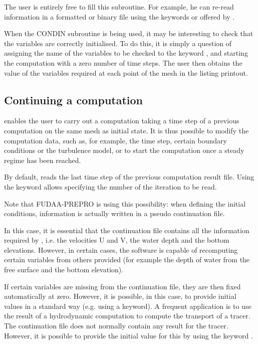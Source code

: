  The user is entirely free to fill this subroutine. For example, he can re-read information in a formatted or binary file using the keywords  or  offered by .

 When the CONDIN subroutine is being used, it may be interesting to check that the variables are correctly initialised. To do this, it is simply a question of assigning the name of the variables to be checked to the keyword  , and starting the computation with a zero number of time steps. The user then obtains the value of the variables required at each point of the mesh in the listing printout.


\subsection{ Continuing a computation}
\label{subs:cont:comput}
  enables the user to carry out a computation taking a time step of a previous computation on the same mesh as initial state. It is thus possible to modify the computation data, such as, for example, the time step, certain boundary conditions or the turbulence model, or to start the computation once a steady regime has been reached.

 By default,  reads the last time step of the previous computation result file. Using the keyword  allows specifying the number of the iteration to be read.

 Note that FUDAA-PREPRO is using this possibility: when defining the initial conditions, information is actually written in a pseudo continuation file.

 In this case, it is essential that the continuation file contains all the information required by , i.e. the velocities U and V, the water depth and the bottom elevations. However, in certain cases, the software is capable of recomputing certain variables from others provided (for example the depth of water from the free surface and the bottom elevation).

 If certain variables are missing from the continuation file, they are then fixed automatically at zero. However, it is possible, in this case, to provide initial values in a standard way (e.g. using a keyword). A frequent application is to use the result of a hydrodynamic computation to compute the transport of a tracer. The continuation file does not normally contain any result for the tracer. However, it is possible to provide the initial value for this by using the keyword .

